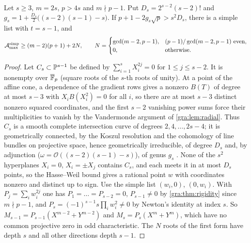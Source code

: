 \begin{theorem}\label{gra:thm:barriercurve}
Let $s\ge3$, $m=2s$, $p>4s$ and $m\nmid p-1$. Put $D_s=2^{s-2}(s-2)!$ and
$g_s=1+\frac{D_s}2\bigl((s-2)(s-1)-s\bigr)$. If
$p+1-2g_s\sqrt p>s^2D_s$, there is a simple list with $t=s-1$, and
\[
 \mathcal{A}^{\mathrm{simp}}_{\max}\ge(m-2)(p+1)+2N,\qquad
 N=\begin{cases}\gcd(m-2,p-1),&(p-1)/\gcd(m-2,p-1)\text{ even},\\0,&\text{otherwise}.\end{cases}
\]
\end{theorem}

\begin{proof}
Let $C_s\subset\mathbb{P}^{s-1}$ be defined by $\sum_{i=1}^sX_i^{2j}=0$ for
$1\le j\le s-2$. It is nonempty over $\overline{\mathbb{F}}_p$ (square roots of the
$s$-th roots of unity). At a point of the affine cone, a dependence of the
gradient rows gives a nonzero $B(T)$ of degree at most $s-3$ with
$X_iB(X_i^2)=0$ for all $i$, so there are at most $s-3$ distinct nonzero
squared coordinates, and the first $s-2$ vanishing power sums force their
multiplicities to vanish by the Vandermonde argument of
\cref{gra:lem:radial}. Thus $C_s$ is a smooth complete intersection curve
of degrees $2,4,\dots,2s-4$; it is geometrically connected, by the Koszul
resolution and the cohomology of line bundles on projective space, hence
geometrically irreducible, of degree $D_s$ and, by adjunction
($\omega=\mathcal O((s-2)(s-1)-s)$), of genus $g_s$
\cite{Hartshorne1977Algebraic}. None of the $s^2$ hyperplanes $X_i=0$,
$X_i=\pm X_j$ contains $C_s$, and each meets it in at most $D_s$ points, so
the Hasse--Weil bound \cite{Weil1948Courbes} gives a rational point $w$ with
coordinates nonzero and distinct up to sign. Use the simple list $(w_i,0)$,
$(0,w_i)$. With $P_j=\sum_iw_i^{2j}$ one has $P_1=\dots=P_{s-2}=0$,
$P_{s-1}\ne0$ by \cref{gra:thm:rigidity} since $m\nmid p-1$, and
$P_s=(-1)^{s-1}s\prod_iw_i^2\ne0$ by Newton's identity at index $s$. So
$M_{s-1}=P_{s-1}(X^{m-2}+Y^{m-2})$ and $M_s=P_s(X^m+Y^m)$, which have no
common projective zero in odd characteristic. The $N$ roots of the first
form have depth $s$ and all other directions depth $s-1$.
\end{proof}

